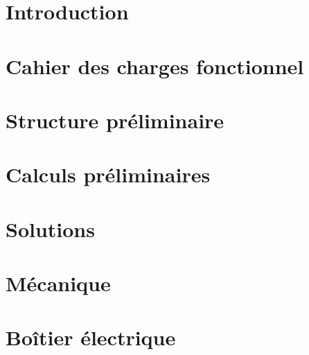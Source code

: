 \documentclass[
    iai, %
    mi, %
]{heig-tb}
\begin{document}
\maketitle
\frontmatter
\clearemptydoublepage

\preamble
\authentification

\begin{abstract}
  
\end{abstract}

\clearemptydoublepage
{
  \tableofcontents
  \let\cleardoublepage\clearpage
  \listoffigures
  \let\cleardoublepage\clearpage
  \listoftables
}

\printnomenclature
\clearemptydoublepage
{}

\mainmatter
\chapter{Introduction}


\chapter{Cahier des charges fonctionnel}


\chapter{Structure préliminaire}


\chapter{Calculs préliminaires}


\chapter{Solutions}


\chapter{Mécanique}


\chapter{Boîtier électrique}

\end{document}
